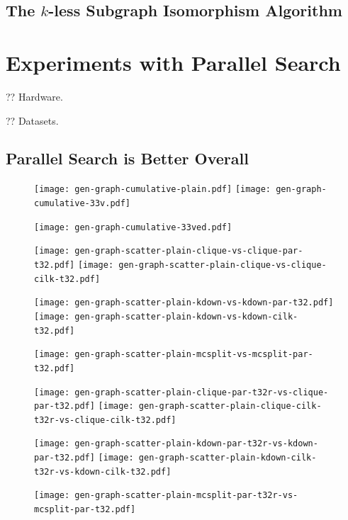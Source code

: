\documentclass{llncs}
\begin{document}
\subsection{The $k$-less Subgraph Isomorphism Algorithm}

\section{Experiments with Parallel Search}

?? Hardware.

?? Datasets.

\subsection{Parallel Search is Better Overall}

\begin{figure}[p]
    \texttt{[image: gen-graph-cumulative-plain.pdf]}
    \hfill
    \texttt{[image: gen-graph-cumulative-33v.pdf]}

    \vspace*{1em}

    \texttt{[image: gen-graph-cumulative-33ved.pdf]}
    \hfill

\end{figure}

\begin{figure}[p]
    \texttt{[image: gen-graph-scatter-plain-clique-vs-clique-par-t32.pdf]}
    \hfill
    \texttt{[image: gen-graph-scatter-plain-clique-vs-clique-cilk-t32.pdf]}

    \vspace*{1em}

    \texttt{[image: gen-graph-scatter-plain-kdown-vs-kdown-par-t32.pdf]}
    \hfill
    \texttt{[image: gen-graph-scatter-plain-kdown-vs-kdown-cilk-t32.pdf]}

    \vspace*{1em}

    \texttt{[image: gen-graph-scatter-plain-mcsplit-vs-mcsplit-par-t32.pdf]}

\end{figure}

\begin{figure}[p]
    \texttt{[image: gen-graph-scatter-plain-clique-par-t32r-vs-clique-par-t32.pdf]}
    \hfill
    \texttt{[image: gen-graph-scatter-plain-clique-cilk-t32r-vs-clique-cilk-t32.pdf]}

    \vspace*{1em}

    \texttt{[image: gen-graph-scatter-plain-kdown-par-t32r-vs-kdown-par-t32.pdf]}
    \hfill
    \texttt{[image: gen-graph-scatter-plain-kdown-cilk-t32r-vs-kdown-cilk-t32.pdf]}

    \vspace*{1em}

    \texttt{[image: gen-graph-scatter-plain-mcsplit-par-t32r-vs-mcsplit-par-t32.pdf]}

\end{figure}
\end{document}
